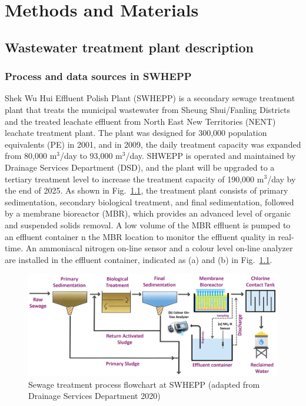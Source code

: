\chapter{Methods and Materials}
\section{Wastewater treatment plant description}
\subsection{Process and data sources in SWHEPP}
Shek Wu Hui Effluent Polish Plant (SWHEPP) is a secondary sewage treatment plant that treats the municipal wastewater from Sheung Shui/Fanling Districts and the treated leachate effluent from North East New Territories (NENT) leachate treatment plant. The plant was designed for 300,000 population equivalents (PE) in 2001, and in 2009, the daily treatment capacity was expanded from 80,000 m$^3$/day to 93,000 m$^3$/day. SHWEPP is operated and maintained by Drainage Services Department (DSD), and the plant will be upgraded to a tertiary treatment level to increase the treatment capacity of 190,000 m$^3$/day by the end of 2025. As shown in Fig.~\ref{fig:SHWEPP-flowchart}, the treatment plant consists of primary sedimentation, secondary biological treatment, and final sedimentation, followed by a membrane bioreactor (MBR), which provides an advanced level of organic and suspended solids removal. A low volume of the MBR effluent is pumped to an effluent container n the MBR location to monitor the effluent quality in real-time. An ammoniacal nitrogen on-line sensor and a colour level on-line analyzer are installed in the effluent container, indicated as (a) and (b) in Fig.~\ref{fig:SHWEPP-flowchart}.

\begin{figure}[!ht]
    \centering
    \includegraphics[width=0.9\columnwidth]{imgs/Sewage-treatment-process-flowchart.png}
    \caption{Sewage treatment process flowchart at SWHEPP (adapted from Drainage Services Department 2020)}
    \label{fig:SHWEPP-flowchart}
\end{figure}

